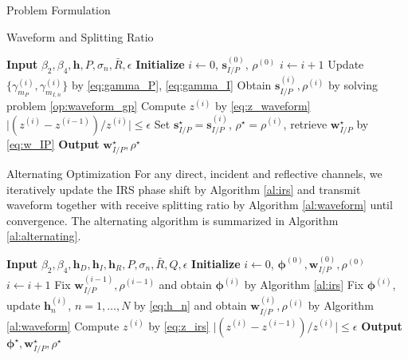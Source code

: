 \documentclass{IEEEtran}
\begin{document}
\begin{section}{Problem Formulation}
\begin{subsection}{Waveform and Splitting Ratio}
\begin{algorithm}
			\label{al:waveform}
			\begin{algorithmic}[1]
				\State \textbf{Input} $\beta_2,\beta_4,\boldsymbol{h},P,\sigma_n,\bar{R},\epsilon$
				\State \textbf{Initialize} $i \gets 0$, $\boldsymbol{s}_{I/P}^{(0)}$, $\rho^{(0)}$
				\Repeat
					\State $i \gets i + 1$
					\State Update $\{\gamma_{m_P}^{(i)},\gamma_{m_{I,n}}^{(i)}\}$ by \ref{eq:gamma_P}, \ref{eq:gamma_I}
					\State Obtain $\boldsymbol{s}_{I/P}^{(i)},\rho^{(i)}$ by solving problem \ref{op:waveform_gp}
					\State Compute $z^{(i)}$ by \ref{eq:z_waveform}
				\Until $\lvert (z^{(i)} - z^{(i-1)}) / z^{(i)} \rvert \le \epsilon$
				\State Set $\boldsymbol{s}_{I/P}^{\star}=\boldsymbol{s}_{I/P}^{(i)}$, $\rho^{\star}=\rho^{(i)}$, retrieve $\boldsymbol{w}_{I/P}^{\star}$ by \ref{eq:w_IP}
				\State \textbf{Output} $\boldsymbol{w}_{I/P}^{\star}, \rho^{\star}$
			\end{algorithmic}
		\end{algorithm}
	\end{subsection}

	\begin{subsection}{Alternating Optimization}
		For any direct, incident and reflective channels, we iteratively update the IRS phase shift by Algorithm \ref{al:irs} and transmit waveform together with receive splitting ratio by Algorithm \ref{al:waveform} until convergence. The alternating algorithm is summarized in Algorithm \ref{al:alternating}.
		\begin{algorithm}
			\caption{Alternating Algorithm for Problem \ref{op:original}}
			\label{al:alternating}
			\begin{algorithmic}[1]
				\State \textbf{Input} $\beta_2,\beta_4,\boldsymbol{h}_D,\boldsymbol{h}_I,\boldsymbol{h}_R,P,\sigma_n,\bar{R},Q,\epsilon$
				\State \textbf{Initialize} $i \gets 0$, $\boldsymbol{\phi}^{(0)},\boldsymbol{w}_{I/P}^{(0)},\rho^{(0)}$
				\Repeat
					\State $i \gets i + 1$
					\State Fix $\boldsymbol{w}_{I/P}^{(i-1)},\rho^{(i-1)}$ and obtain $\boldsymbol{\phi}^{(i)}$ by Algorithm \ref{al:irs}
					\State Fix $\boldsymbol{\phi}^{(i)}$, update $\boldsymbol{h}_n^{(i)}$, $n=1,\dots,N$ by \ref{eq:h_n} and obtain $\boldsymbol{w}_{I/P}^{(i)}, \rho^{(i)}$ by Algorithm \ref{al:waveform}
					\State Compute $z^{(i)}$ by \ref{eq:z_irs}
				\Until $\lvert (z^{(i)} - z^{(i-1)}) / z^{(i)} \rvert \le \epsilon$
				\State \textbf{Output} $\boldsymbol{\phi}^{\star}, \boldsymbol{w}_{I/P}^{\star}, \rho^{\star}$
			\end{algorithmic}
		\end{algorithm}
	\end{subsection}


\end{section}
\end{document}
